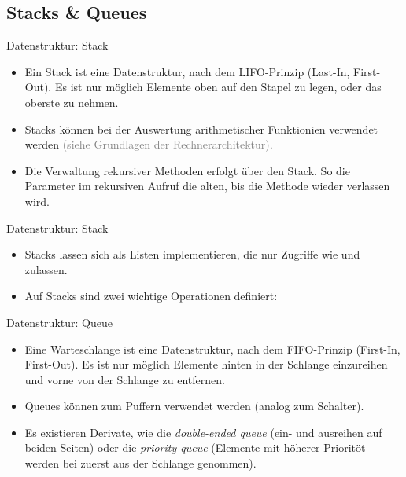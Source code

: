 \subsection{Stacks \& Queues}

\begin{frame}{Datenstruktur: Stack}
    \hypertarget<1>{mrk:Stack}{}%
    \begin{itemize}[<+(1)->]
        \widei
        \item Ein Stack ist eine Datenstruktur, nach dem LIFO-Prinzip (Last-In, First-Out).\pause{} Es ist nur möglich Elemente oben auf den Stapel zu legen, oder das oberste zu nehmen.
        \item Stacks können bei der Auswertung arithmetischer Funktionien verwendet werden \textcolor{gray}{(siehe Grundlagen der Rechnerarchitektur)}.
        \item Die Verwaltung rekursiver Methoden erfolgt über den Stack. So  die Parameter im rekursiven Aufruf die alten, bis die Methode wieder verlassen wird.
    \end{itemize}
\end{frame}

\begin{frame}{Datenstruktur: Stack}
    \begin{itemize}[<+(1)->]
        \widei
        \item Stacks lassen sich als Listen implementieren,\pause{} die nur Zugriffe wie  und  zulassen.
        \item Auf Stacks sind zwei wichtige Operationen definiert: 
    \end{itemize}
\end{frame}

\begin{frame}{Datenstruktur: Queue}
    \begin{itemize}[<+(1)->]
        \widei
        \item Eine Warteschlange ist eine Datenstruktur, nach dem FIFO-Prinzip (First-In, First-Out).\pause{} Es ist nur möglich Elemente hinten in der Schlange einzureihen und vorne von der Schlange zu entfernen.
        \item Queues können zum Puffern verwendet werden (analog zum Schalter).
        \item Es existieren Derivate, wie die \emph{double-ended queue} (ein- und ausreihen auf beiden Seiten) oder die \emph{priority queue} (Elemente mit höherer Prioritöt werden bei  zuerst aus der Schlange genommen).
    \end{itemize}
\end{frame}

